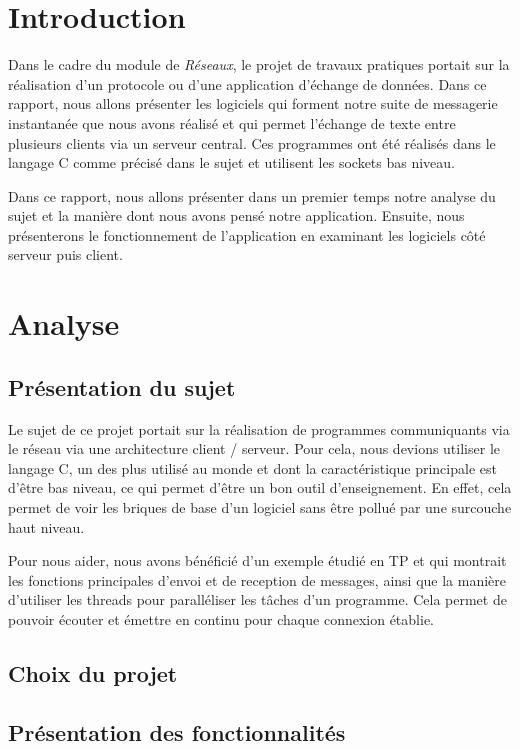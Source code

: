 \chapter*{Introduction}
	Dans le cadre du module de \emph{Réseaux}, le projet de travaux pratiques portait sur la réalisation d'un protocole ou d'une application d'échange de données. Dans ce rapport, nous allons présenter les logiciels qui forment notre suite de messagerie instantanée que nous avons réalisé et qui permet l'échange de texte entre plusieurs clients via un serveur central. Ces programmes ont été réalisés dans le langage C comme précisé dans le sujet et utilisent les sockets bas niveau.
	
	Dans ce rapport, nous allons présenter dans un premier temps notre analyse du sujet et la manière dont nous avons pensé notre application. Ensuite, nous présenterons le fonctionnement de l'application en examinant les logiciels côté serveur puis client. 
		
\chapter{Analyse}
	\section{Présentation du sujet}
		Le sujet de ce projet portait sur la réalisation de programmes communiquants via le réseau via une architecture client / serveur.  Pour cela, nous devions utiliser le langage C, un des plus utilisé au monde et dont la caractéristique principale est d'être bas niveau, ce qui permet d'être un bon outil d'enseignement. En effet, cela permet de voir les briques de base d'un logiciel sans être pollué par une surcouche haut niveau.
		
		Pour nous aider, nous avons bénéficié d'un exemple étudié en TP et qui montrait les fonctions principales d'envoi et de reception de messages, ainsi que la manière d'utiliser les threads pour paralléliser les tâches d'un programme. Cela permet de pouvoir écouter et émettre en continu pour chaque connexion établie.

	\section{Choix du projet}
		

	\section{Présentation des fonctionnalités}

